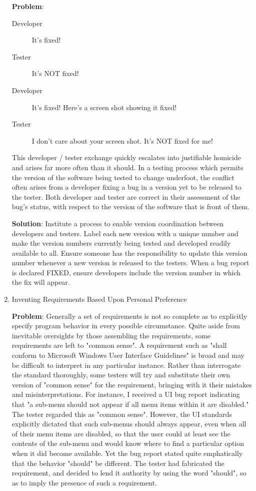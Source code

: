\documentclass{article}
\begin{document}
\begin{enumerate}
\textbf{Problem}:

\begin{description}
\item[{Developer}] It's fixed!
\item[{Tester}] It's NOT fixed!
\item[{Developer}] It's fixed! Here's a screen shot showing it fixed!
\item[{Tester}] I don't care about your screen shot. It's NOT fixed for me!
\end{description}

This developer / tester exchange quickly escalates into justifiable
homicide and arises far more often than it should. In a testing process
which permits the version of the software being tested to change
underfoot, the conflict often arises from a developer fixing a bug in a
version yet to be released to the tester. Both developer and tester are
correct in their assessment of the bug's status, with respect to the
version of the software that is front of them.

\textbf{Solution}: Institute a process to enable version coordination between
developers and testers. Label each new version with a unique number and
make the version numbers currently being tested and developed readily
available to all. Ensure someone has the responsibility to update this
version number whenever a new version is released to the testers. When a
bug report is declared FIXED, ensure developers include the version
number in which the fix will appear.

\item Inventing Requirements Based Upon Personal Preference
\label{sec:orgheadline97}

\textbf{Problem}: Generally a set of requirements is not so complete as to
explicitly specify program behavior in every possible circumstance.
Quite aside from inevitable oversights by those assembling the
requirements, some requirements are left to "common sense". A
requirement such as "shall conform to Microsoft Windows User Interface
Guidelines" is broad and may be difficult to interpret in any particular
instance. Rather than interrogate the standard thoroughly, some testers
will try and substitute their own version of "common sense" for the
requirement, bringing with it their mistakes and misinterpretations. For
instance, I received a UI bug report indicating that "a sub-menu should
not appear if all menu items within it are disabled." The tester
regarded this as "common sense". However, the UI standards explicitly
dictated that such sub-menus should always appear, even when all of
their menu items are disabled, so that the user could at least see the
contents of the sub-menu and would know where to find a particular
option when it did become available. Yet the bug report stated quite
emphatically that the behavior "should" be different. The tester had
fabricated the requirement, and decided to lend it authority by using
the word "should", so as to imply the presence of such a requirement.


\end{enumerate}
\end{document}
